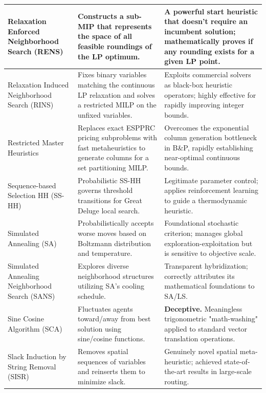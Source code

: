 \begin{center}
\begin{longtable}{
  >{\raggedright\arraybackslash}p{}
  >{\raggedright\arraybackslash}p{}
  >{\raggedright\arraybackslash}p{}
}
Relaxation Enforced Neighborhood Search (RENS) & Constructs a sub-MIP that represents the space of all feasible roundings of the LP optimum. & A powerful start heuristic that doesn't require an incumbent solution; mathematically proves if any rounding exists for a given LP point. \\ \midrule

Relaxation Induced Neighborhood Search (RINS) & Fixes binary variables matching the continuous LP relaxation and solves a restricted MILP on the unfixed variables. & Exploits commercial solvers as black-box heuristic operators; highly effective for rapidly improving integer bounds. \\ \midrule

Restricted Master Heuristics & Replaces exact ESPPRC pricing subproblems with fast metaheuristics to generate columns for a set partitioning MILP. & Overcomes the exponential column generation bottleneck in B\&P, rapidly establishing near-optimal continuous bounds. \\ \midrule

Sequence-based Selection HH (SS-HH) & Probabilistic SS-HH governs threshold transitions for Great Deluge local search. & Legitimate parameter control; applies reinforcement learning to guide a thermodynamic heuristic. \\ \midrule

Simulated Annealing (SA) & Probabilistically accepts worse moves based on Boltzmann distribution and temperature. & Foundational stochastic criterion; manages global exploration-exploitation but is sensitive to objective scale. \\ \midrule

Simulated Annealing Neighborhood Search (SANS) & Explores diverse neighborhood structures utilizing SA's cooling schedule. & Transparent hybridization; correctly attributes its mathematical foundations to SA/LS. \\ \midrule

Sine Cosine Algorithm (SCA) & Fluctuates agents toward/away from best solution using sine/cosine functions. & \textbf{Deceptive.} Meaningless trigonometric "math-washing" applied to standard vector translation operations. \\ \midrule

Slack Induction by String Removal (SISR) & Removes spatial sequences of variables and reinserts them to minimize slack. & Genuinely novel spatial meta-heuristic; achieved state-of-the-art results in large-scale routing. \\ \midrule


\end{longtable}
\end{center}
